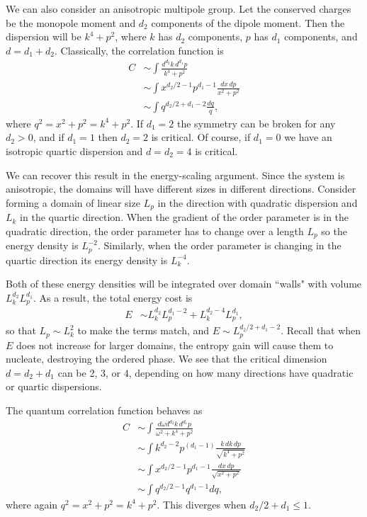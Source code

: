 \documentclass[pra,aps,twocolumn, amsfonts,amsmath,amssymb,nofootinbib,superscriptaddress]{revtex4}
\newcommand{\nn}{\nonumber\\}
\begin{document}
We can also consider an anisotropic multipole group. 
Let the conserved charges be the monopole moment and $d_2$ components of the dipole moment. Then the dispersion will be $k^4 + p^2$, where $k$ has $d_2$ components, $p$ has $d_1$ components, and $d = d_1+d_2$. Classically, the correlation function is
\begin{align}
C &\sim \int \frac{d^{d_2} k \, d^{d_1} p}{k^4 + p^2}\nn
&\sim \int x^{d_2/2 -1} p^{d_1-1} \frac{dx\, dp}{x^2 +p^2} \nn
&\sim \int q^{d_2/2 + d_1 - 2}\frac{dq}{q},
\end{align}
where $q^2 = x^2 + p^2 = k^4 + p^2$. 
If $d_1=2$ the symmetry can be broken for any $d_2>0$, and if $d_1=1$ then $d_2=2$  is critical. Of course, if $d_1=0$ we have an isotropic quartic dispersion and $d=d_2=4$ is critical. 

We can recover this result in  the energy-scaling argument. Since the system is anisotropic, the domains will have different sizes in different directions. Consider forming a domain of linear size $L_p$ in the  direction with quadratic dispersion and $L_k$ in the quartic direction. When the gradient of the order parameter is in the quadratic direction, the order parameter has to change over a length $L_p$ so the energy density is $L_p^{-2}$. Similarly, when the order parameter is changing in the quartic direction its energy density is $L_k^{-4}$. 

Both of these energy densities will be integrated over domain ``walls" with volume $L_k^{d_2} L_p^{d_1}$.
As a result, the total energy cost is
\begin{align}
E &\sim L_k^{d_2} L_p^{d_1-2} + L_k^{d_2-4} L_p^{d_1},
\end{align}
so that $L_p \sim L_k^2$ to make the terms match, and $E\sim L_p^{d_2/2+d_1-2}$. Recall that when $E$ does not increase for larger domains, the entropy gain will cause them to nucleate, destroying the ordered phase.
We see that the critical dimension $d= d_2 + d_1$ can be 2, 3, or 4, depending on how many directions have quadratic or quartic dispersions.

The quantum correlation function behaves as
\begin{align}
C &\sim \int \frac{d\omega d^{d_2} k \, d^{d_1} p}{\omega^2 + k^4 + p^2}\nn
&\sim \int k^{d_2 - 2} p^{ (d_1-1)} \frac{k\,dk\, dp}{\sqrt{k^4 + p^2}} \nn
&\sim \int x^{d_2/2-1} p^{d_1-1} \frac{dx\, dp}{\sqrt{x^2 + p^2}} \nn
&\sim \int q^{d_2/2 -1} q^{d_1 -1} dq,
\end{align}
where again $q^2 = x^2 + p^2 = k^4 + p^2$. This diverges when $d_2/2 + d_1 \le 1$. 
\end{document}
